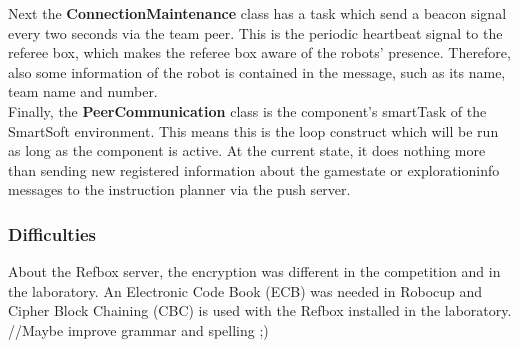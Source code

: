 Next the \textbf{ConnectionMaintenance} class has a task which send a beacon signal every two seconds via the team peer. This is the periodic heartbeat signal to the referee box, which makes the referee box aware of the robots’ presence. Therefore, also some information of the robot is contained in the message, such as its name, team name and number.\\

Finally, the \textbf{PeerCommunication} class is the component’s smartTask of the SmartSoft environment. This means this is the loop construct which will be run as long as the component is active. At the current state, it does nothing more than sending new registered information about the gamestate or explorationinfo messages to the instruction planner via the push server.\\


\subsubsection{Difficulties}

About the Refbox server, the encryption was different in the competition and in the laboratory. An Electronic Code Book (ECB) was needed in Robocup and Cipher Block Chaining (CBC) is used with the Refbox installed in the laboratory. \\

//Maybe improve grammar and spelling ;) 